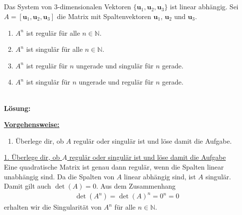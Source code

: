 \newpage

\subsection*{}
Das System von $3$-dimensionalen Vektoren
$\lbrace \textbf{u}_1, \textbf{u}_2, \textbf{u}_3 \rbrace$
ist linear abhängig.
Sei $A = [\textbf{u}_1, \textbf{u}_2, \textbf{u}_3]$ die Matrix mit Spaltenvektoren $\textbf{u}_1$, $\textbf{u}_2$ und $\textbf{u}_3$. 
\renewcommand{\labelenumi}{(\alph{enumi})}
\begin{enumerate}
\item 
$A^n$ ist regulär für alle $n \in \mathbb{N}$.
\item
$A^n$ ist singulär für alle $n \in \mathbb{N}$.
\item
$A^n$ ist regulär für $n$ ungerade und singulär für $n$ gerade.
\item
$A^n$ ist singulär für $n$ ungerade und regulär für $n$ gerade.
\end{enumerate}
\ \\
\textbf{Lösung:}
\begin{mdframed}
\underline{\textbf{Vorgehensweise:}}
\renewcommand{\labelenumi}{\theenumi.}
\begin{enumerate}
\item Überlege dir, ob $A$ regulär oder singulär ist und löse damit die Aufgabe.
\end{enumerate}
\end{mdframed}

\underline{1. Überlege dir, ob $A$ regulär oder singulär ist und löse damit die Aufgabe}\\
Eine quadratische Matrix ist genau dann regulär, wenn die Spalten linear unabhängig sind.
Da die Spalten von $A$ linear abhängig sind, ist $A$ singulär.
Damit gilt auch $\det(A) = 0$.
Aus dem Zusammenhang
\begin{align*}
\det\left(A^n\right) = \det(A)^n = 0^n = 0
\end{align*}
erhalten wir die Singularität von $A^n$ für alle $n \in \mathbb{N}$.

\newpage

